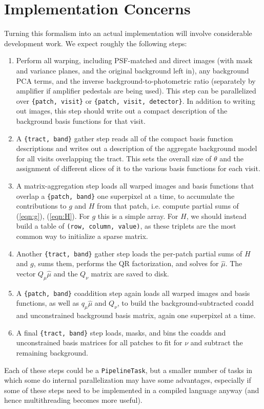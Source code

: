 \documentclass[DM,lsstdraft,authoryear,toc]{lsstdoc}
\begin{document}
\section{Implementation Concerns}

Turning this formalism into an actual implementation will involve considerable development work.
We expect roughly the following steps:
\begin{enumerate}
	\item
	      Perform all warping, including PSF-matched and direct images (with mask and variance planes, and the original background left in), any background PCA terms, and the inverse background-to-photometric ratio (separately by amplifier if amplifier pedestals are being used).
	      This step can be parallelized over \texttt{\{patch, visit\}} or \texttt{\{patch, visit, detector\}}.
	      In addition to writing out images, this step should write out a compact description of the background basis functions for that visit.
	\item
	      A \texttt{\{tract, band\}} gather step reads all of the compact basis function descriptions and writes out a description of the aggregate background model for all visits overlapping the tract.
	      This sets the overall size of $\theta$ and the assignment of different slices of it to the various basis functions for each visit.
	\item
	      A matrix-aggregation step loads all warped images and basis functions that overlap a \texttt{\{patch, band\}} one superpixel at a time, to accumulate the contributions to $g$ and $H$ from that patch, i.e. compute partial sums of (\ref{eqn:g}), (\ref{eqn:H}).
	      For $g$ this is a simple array.
	      For $H$, we should instead build a table of \texttt{(row, column, value)}, as these triplets are the most common way to initialize a sparse matrix.
	\item
	      Another \texttt{\{tract, band\}} gather step loads the per-patch partial sums of $H$ and $g$, sums them, performs the QR factorization, and solves for $\hat{\mu}$.
	      The vector $Q_\mu\hat{\mu}$ and the $Q_\nu$ matrix are saved to disk.
	\item
	      A \texttt{\{patch, band\}} coaddition step again loads all warped images and basis functions, as well as $q_\mu\hat{\mu}$ and $Q_\nu$, to build the background-subtracted coadd and unconstrained background basis matrix, again one superpixel at a time.
	\item
	      A final \texttt{\{tract, band\}} step loads, masks, and bins the coadds and unconstrained basis matrices for all patches to fit for $\nu$ and subtract the remaining background.
\end{enumerate}
Each of these steps could be a \texttt{PipelineTask}, but a smaller number of tasks in which some do internal parallelization may have some advantages, especially if some of these steps need to be implemented in a compiled language anyway (and hence multithreading becomes more useful).
\end{document}
